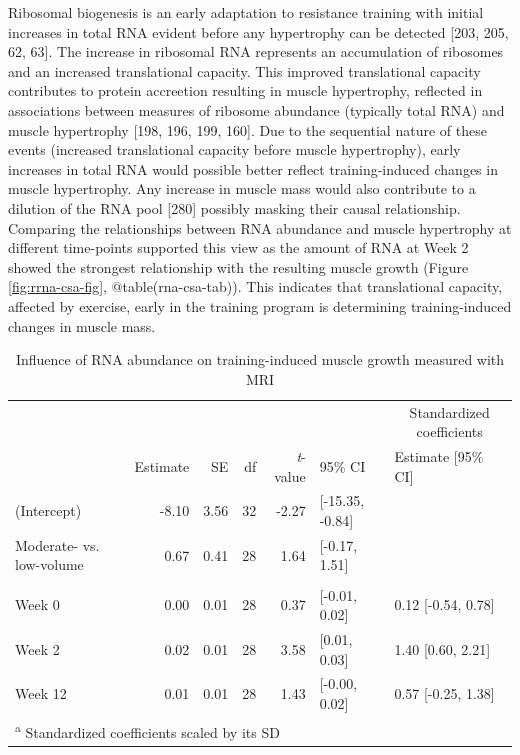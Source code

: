 \documentclass[twoside,10pt]{gihclass} %
\begin{document}
Ribosomal biogenesis is an early adaptation to resistance training with initial increases in total RNA evident before any hypertrophy can be detected
{[}203, 205, 62, 63{]}.
The increase in ribosomal RNA represents an accumulation of ribosomes and an increased translational capacity. This improved translational capacity contributes to protein accreetion resulting in muscle hypertrophy, reflected in associations between measures of ribosome abundance (typically total RNA) and muscle hypertrophy
{[}198, 196, 199, 160{]}.
Due to the sequential nature of these events (increased translational capacity before muscle hypertrophy), early increases in total RNA would possible better reflect training-induced changes in muscle hypertrophy.
Any increase in muscle mass would also contribute to a dilution of the RNA pool
{[}280{]}
possibly masking their causal relationship.
Comparing the relationships between RNA abundance and muscle hypertrophy at different time-points supported this view as the amount of RNA at Week 2 showed the strongest relationship with the resulting muscle growth (Figure \ref{fig:rrna-csa-fig}, @table(rna-csa-tab)). This indicates that translational capacity, affected by exercise, early in the training program is determining training-induced changes in muscle mass.
\begin{table}

\caption{\label{tab:rna-csa-tab}Influence of RNA abundance on training-induced muscle growth measured with MRI}
\centering
\fontsize{8}{10}\selectfont
\begin{tabular}[t]{lrrrrll}
\toprule
\multicolumn{6}{c}{ } & \multicolumn{1}{c}{Standardized coefficients} \\
\cmidrule(l{3pt}r{3pt}){7-7}
 & Estimate & SE & df & \textit{t}-value & 95\% CI & Estimate [95\% CI]\\
\midrule
(Intercept) & -8.10 & 3.56 & 32 & -2.27 & [-15.35, -0.84] & \\
Moderate- vs. low-volume & 0.67 & 0.41 & 28 & 1.64 & [-0.17, 1.51] & \\
\addlinespace[0.3em]
\multicolumn{7}{l}{\textbf{RNA abundance (ng mg\textsuperscript{-1})}}\\
\hspace{1em}Week 0 & 0.00 & 0.01 & 28 & 0.37 & [-0.01, 0.02] & 0.12 [-0.54, 0.78]\\
\hspace{1em}Week 2 & 0.02 & 0.01 & 28 & 3.58 & [0.01, 0.03] & 1.40 [0.60, 2.21]\\
\hspace{1em}Week 12 & 0.01 & 0.01 & 28 & 1.43 & [-0.00, 0.02] & 0.57 [-0.25, 1.38]\\
\bottomrule
\multicolumn{7}{l}{\textsuperscript{a} Standardized coefficients scaled by its SD}\\
\end{tabular}
\end{table}
\end{document}
